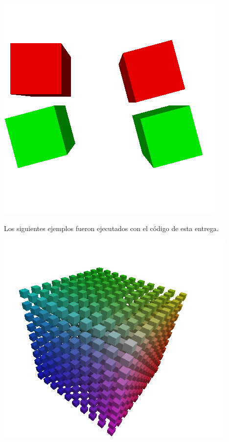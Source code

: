 \centerline{\includegraphics[scale=0.40]{../imagenes/eg11_nuevo.png}}

\newpage
Los siguientes ejemplos fueron ejecutados con el c\'odigo de esta entrega.\\


\centerline{\includegraphics[scale=0.40]{../imagenes/eg22.png}}




